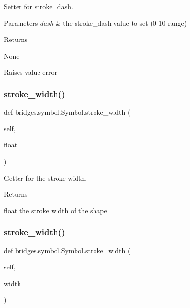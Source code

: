 Setter for stroke\+\_\+dash. 


\begin{DoxyParams}{Parameters}
{\em dash} & the stroke\+\_\+dash value to set (0-\/10 range) \\
\hline
\end{DoxyParams}
\begin{DoxyReturn}{Returns}


None 

Raises value error 
\end{DoxyReturn}
\mbox{\label{classbridges_1_1symbol_1_1_symbol_a4da625974fcb3ac83a60489a7c059c10}} 
\subsubsection{\texorpdfstring{stroke\+\_\+width()}{stroke\_width()}\hspace{0.1cm}{\footnotesize\ttfamily [1/2]}}
{\footnotesize\ttfamily def bridges.\+symbol.\+Symbol.\+stroke\+\_\+width (\begin{DoxyParamCaption}\item[{}]{self,  }\item[{}]{float }\end{DoxyParamCaption})}



Getter for the stroke width. 

\begin{DoxyReturn}{Returns}


float the stroke width of the shape 
\end{DoxyReturn}
\mbox{\label{classbridges_1_1symbol_1_1_symbol_a85c961221005786cd8f5b31fec3fd8d2}} 
\subsubsection{\texorpdfstring{stroke\+\_\+width()}{stroke\_width()}\hspace{0.1cm}{\footnotesize\ttfamily [2/2]}}
{\footnotesize\ttfamily def bridges.\+symbol.\+Symbol.\+stroke\+\_\+width (\begin{DoxyParamCaption}\item[{}]{self,  }\item[{}]{width }\end{DoxyParamCaption})}




